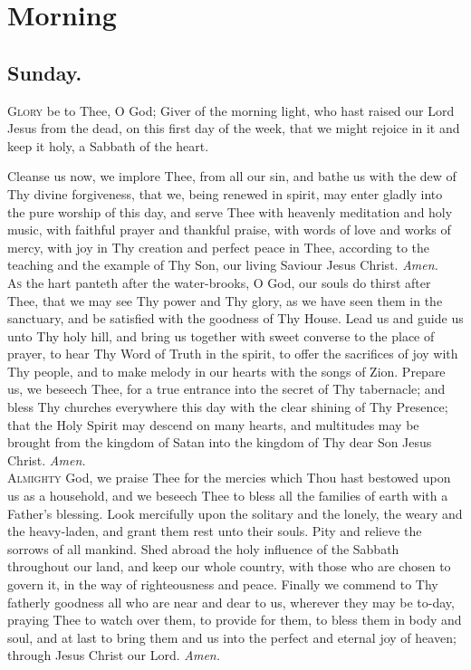 \section*{Morning}

\subsection*{Sunday.}

\lettrine{G}{lory} be to Thee, O God; Giver of the morning light,
who hast raised our Lord Jesus from the dead, on this
first day of the week, that we might rejoice in it and keep
it holy, a Sabbath of the heart.

Cleanse us now, we implore Thee, from all our sin, and
bathe us with the dew of Thy divine forgiveness, that we,
being renewed in spirit, may enter gladly into the pure
worship of this day, and serve Thee with heavenly meditation and holy music, with faithful prayer and thankful
praise, with words of love and works of mercy, with joy in
Thy creation and perfect peace in Thee, according to the
teaching and the example of Thy Son, our living Saviour
Jesus Christ.
\textit{Amen.} \\

\lettrine{A}{s} the hart panteth after the water-brooks, O God, our
souls do thirst after Thee, that we may see Thy power
and Thy glory, as we have seen them in the sanctuary, and
be satisfied with the goodness of Thy House. Lead us and
guide us unto Thy holy hill, and bring us together with
sweet converse to the place of prayer, to hear Thy Word of
Truth in the spirit, to offer the sacrifices of joy with Thy
people, and to make melody in our hearts with the songs
of Zion. Prepare us, we beseech Thee, for a true entrance
into the secret of Thy tabernacle; and bless Thy churches
everywhere this day with the clear shining of Thy Presence; that the Holy Spirit may descend on many hearts,
and multitudes may be brought from the kingdom of Satan
into the kingdom of Thy dear Son Jesus Christ.
\textit{Amen.} \\

\lettrine{A}{lmighty} God, we praise Thee for the mercies which
Thou hast bestowed upon us as a household, and we
beseech Thee to bless all the families of earth with a Father’s blessing. Look mercifully upon the solitary and the
lonely, the weary and the heavy-laden, and grant them rest
unto their souls. Pity and relieve the sorrows of all mankind. Shed abroad the holy influence of the Sabbath
throughout our land, and keep our whole country, with
those who are chosen to govern it, in the way of righteousness and peace. Finally we commend to Thy fatherly
goodness all who are near and dear to us, wherever they
may be to-day, praying Thee to watch over them, to provide for them, to bless them in body and soul, and at last
to bring them and us into the perfect and eternal joy of
heaven; through Jesus Christ our Lord.
\textit{Amen.} \\ \\

